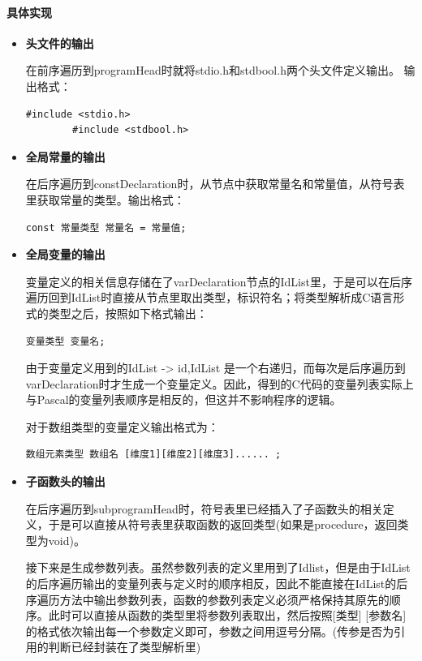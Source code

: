 \documentclass[../main.tex]{subfiles}
\begin{document}
\paragraph{具体实现}
\begin{itemize}
    \item \textbf{头文件的输出}
    
    在前序遍历到programHead时就将stdio.h和stdbool.h两个头文件定义输出。
    输出格式：
    \begin{lstlisting}[style = c]
        #include <stdio.h>
        #include <stdbool.h>
    \end{lstlisting}

    \item \textbf{全局常量的输出}
    
    在后序遍历到constDeclaration时，从节点中获取常量名和常量值，从符号表里获取常量的类型。输出格式：
    \begin{lstlisting}[style = c]
        const 常量类型 常量名 = 常量值;   
    \end{lstlisting}

    \item \textbf{全局变量的输出}
    
    变量定义的相关信息存储在了varDeclaration节点的IdList里，于是可以在后序遍历回到IdList时直接从节点里取出类型，标识符名；将类型解析成C语言形式的类型之后，按照如下格式输出：
    \begin{lstlisting}[style = c]
        变量类型 变量名;  
    \end{lstlisting}

    由于变量定义用到的IdList -> id,IdList 是一个右递归，而每次是后序遍历到varDeclaration时才生成一个变量定义。因此，得到的C代码的变量列表实际上与Pascal的变量列表顺序是相反的，但这并不影响程序的逻辑。

    对于数组类型的变量定义输出格式为：
    \begin{lstlisting}[style = c]
        数组元素类型 数组名 [维度1][维度2][维度3]...... ;
    \end{lstlisting}

    \item \textbf{子函数头的输出}
    
    在后序遍历到subprogramHead时，符号表里已经插入了子函数头的相关定义，于是可以直接从符号表里获取函数的返回类型(如果是procedure，返回类型为void)。

    接下来是生成参数列表。虽然参数列表的定义里用到了Idlist，但是由于IdList的后序遍历输出的变量列表与定义时的顺序相反，因此不能直接在IdList的后序遍历方法中输出参数列表，函数的参数列表定义必须严格保持其原先的顺序。此时可以直接从函数的类型里将参数列表取出，然后按照[类型] [参数名] 的格式依次输出每一个参数定义即可，参数之间用逗号分隔。(传参是否为引用的判断已经封装在了类型解析里)


\end{itemize}
\end{document}
